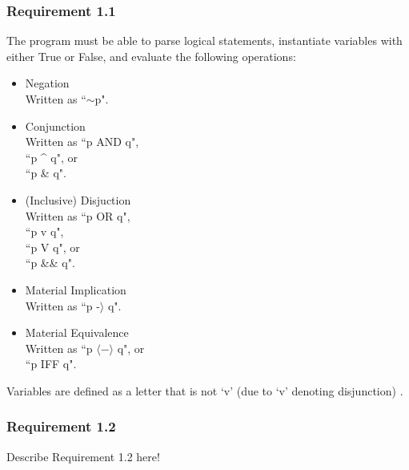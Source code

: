 \documentclass{article}
\begin{document}
\subsubsection{Requirement 1.1}
The program must be able to parse logical statements, instantiate variables with either True or False, and evaluate the following operations:
\begin{itemize}
	\item Negation\\
		Written as ``$\sim$p".
	\item Conjunction\\
		Written as ``p AND q",\\
		``p \^{} q", or\\
		``p \& q".
	\item (Inclusive) Disjuction\\
		Written as ``p OR q",\\
		``p v q",\\
		``p V q", or\\
		``p \&\& q".
	\item Material Implication\\
		Written as ``p -$\rangle $ q".
	\item Material Equivalence\\
		Written as ``p $\langle-\rangle$ q", or\\
		``p IFF q".
\end{itemize}
Variables are defined as a letter that is not `v' (due to `v' denoting disjunction) \cite{hawthorne}.
\subsubsection{Requirement 1.2}
Describe Requirement 1.2 here!

\printbibliography
\end{document}
